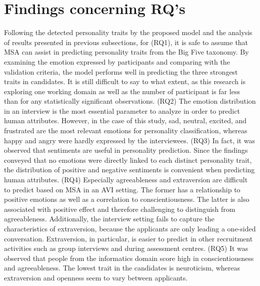\section{Findings concerning RQ's}
Following the detected personality traits by the proposed model and the analysis of results presented in previous subsections, for (RQ1), it is safe to assume that MSA can assist in predicting personality traits from the Big Five taxonomy. By examining the emotion expressed by participants and comparing with the validation criteria, the model performs well in predicting the three strongest traits in candidates. It is still difficult to say to what extent, as this research is exploring one working domain as well as the number of participant is far less than for any statistically significant observations. (RQ2) The emotion distribution in an interview is the most essential parameter to analyze in order to predict human attributes. However, in the case of this study, sad, neutral, excited, and frustrated are the most relevant emotions for personality classification, whereas happy and angry were hardly expressed by the interviewees. (RQ3) In fact, it was observed that sentiments are useful in personality prediction. Since the findings conveyed that no emotions were directly linked to each distinct personality trait, the distribution of positive and negative sentiments is convenient when predicting human attributes. (RQ4) Especially agreeableness and extraversion are difficult to predict based on MSA in an AVI setting. The former has a relationship to positive emotions as well as a correlation to conscientiousness. The latter is also associated with positive effect and therefore challenging to distinguish from agreeableness. Additionally, the interview setting fails to capture the characteristics of extraversion, because the applicants are only leading a one-sided conversation. Extraversion, in particular, is easier to predict in other recruitment activities such as group interviews and during assessment centres. (RQ5) It was observed that people from the informatics domain score high in conscientiousness and agreeableness. The lowest trait in the candidates is neuroticism, whereas extraversion and openness seem to vary between applicants. 

